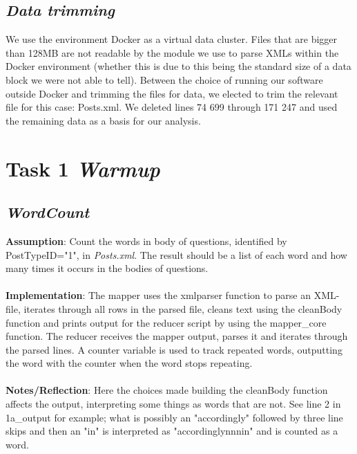 \documentclass[fleqn,10pt]{wlscirep}
\begin{document}
\subsection{\emph{Data trimming}}
We use the environment Docker as a virtual data cluster. Files that are bigger than 128MB are not readable by the module we use to parse XMLs within the Docker environment (whether this is due to this being the standard size of a data block we were not able to tell). Between the choice of running our software outside Docker and trimming the files for data, we elected to trim the relevant file for this case: Posts.xml. We deleted lines 74 699 through 171 247 and used the remaining data as a basis for our analysis.

\section{Task 1 \emph{Warmup}}
\subsection{\emph{WordCount}}
\textbf{Assumption}: Count the words in body of questions, identified by PostTypeID="1", in \textit{Posts.xml}. The result should be a list of each word and how many times it occurs in the bodies of questions. \\ \\
\textbf{Implementation}: The mapper uses the xmlparser function to parse an XML-file, iterates through all rows in the parsed file, cleans text using the cleanBody function and prints output for the reducer script by using the mapper\_core function.
The reducer receives the mapper output, parses it and iterates through the parsed lines. A counter variable is used to track repeated words, outputting the word with the counter when the word stops repeating. \\ \\
\textbf{Notes/Reflection}: Here the choices made building the cleanBody function affects the output, interpreting some things as words that are not. See line 2 in 1a\_output for example; what is possibly an "accordingly" followed by three line skips and then an "in" is interpreted as "accordinglynnnin" and is counted as a word. \\


\end{document}
